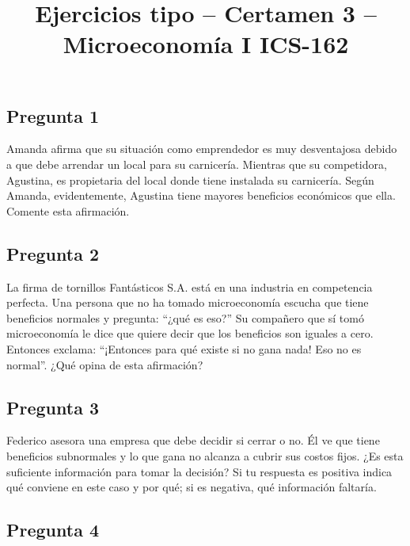 \documentclass[12pt,letterpaper]{article}
\title{\textbf{Ejercicios tipo -- Certamen 3 -- Microeconomía I ICS-162}}
\date{}
\begin{document}
\maketitle



\subsection*{Pregunta 1}

Amanda afirma que su situación como emprendedor es muy desventajosa debido a que debe arrendar un local para su carnicería. Mientras que su competidora, Agustina, es propietaria del local donde tiene instalada su carnicería. Según Amanda, evidentemente, Agustina tiene mayores beneficios económicos que ella. Comente esta afirmación.


\subsection*{Pregunta 2}

La firma de tornillos Fantásticos S.A. está en una industria en competencia perfecta. Una persona que no ha tomado microeconomía escucha que tiene beneficios normales y pregunta: ``¿qué es eso?'' Su compañero que sí tomó microeconomía le dice que quiere decir que los beneficios son iguales a cero. Entonces exclama: ``¡Entonces para qué existe si no gana nada! Eso no es normal''. ¿Qué opina de esta afirmación?



\subsection*{Pregunta 3}

Federico asesora una empresa que debe decidir si cerrar o no. Él ve que tiene beneficios subnormales y lo que gana no alcanza a cubrir sus costos fijos. ¿Es esta suficiente información para tomar la decisión? Si tu respuesta es positiva indica qué conviene en este caso y por qué; si es negativa, qué información faltaría.



\subsection*{Pregunta 4}
\end{document}
